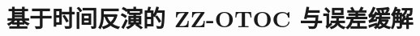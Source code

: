 \documentclass[../main.tex]{subfiles}
\begin{document}




\section{基于时间反演的 ZZ-OTOC 与误差缓解}
\end{document}
